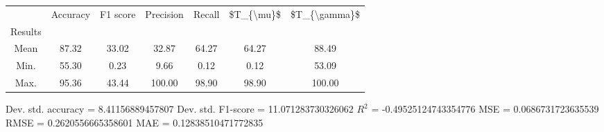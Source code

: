 \begin{tabular}{|c|c|c|c|c|c|c|}
\toprule
{} &  Accuracy &  F1 score &  Precision &  Recall &  \$T\_\{\textbackslash mu\}\$ &  \$T\_\{\textbackslash gamma\}\$ \\
Results &           &           &            &         &            &               \\
\hline
Mean    &     87.32 &     33.02 &      32.87 &   64.27 &      64.27 &         88.49 \\
Min.    &     55.30 &      0.23 &       9.66 &    0.12 &       0.12 &         53.09 \\
Max.    &     95.36 &     43.44 &     100.00 &   98.90 &      98.90 &        100.00 \\
\bottomrule
\end{tabular}

 Dev. std. accuracy = 8.41156889457807
 Dev. std. F1-score = 11.071283730326062
 $R^2$ = -0.49525124743354776
 MSE = 0.0686731723635539
 RMSE = 0.2620556665358601
 MAE = 0.12838510471772835